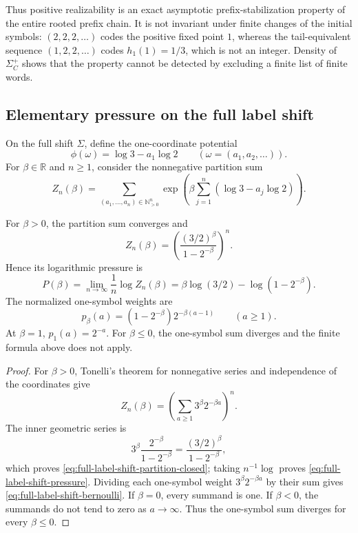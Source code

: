 Thus positive realizability is an exact asymptotic prefix-stabilization
property of the entire rooted prefix chain.  It is not invariant under finite
changes of the initial symbols: $(2,2,2,\ldots)$ codes the positive fixed point
$1$, whereas the tail-equivalent sequence $(1,2,2,\ldots)$ codes
$h_1(1)=1/3$, which is not an integer.  Density of $\Sigma_C^+$ shows that the
property cannot be detected by excluding a finite list of finite words.

\subsection{Elementary pressure on the full label shift}

On the full shift $\Sigma$, define the one-coordinate potential
\[
 \phi(\omega)=\log3-a_1\log2
 \qquad(\omega=(a_1,a_2,\ldots)).
\]
For $\beta\in\mathbb R$ and $n\geq1$, consider the nonnegative partition sum
\begin{equation}
\label{eq:full-label-shift-partition}
 Z_n(\beta)
 =\sum_{(a_1,\ldots,a_n)\in\mathbb N_{>0}^n}
   \exp\left(\beta\sum_{j=1}^n(\log3-a_j\log2)\right).
\end{equation}

\begin{proposition}
\label{prop:full-label-shift-pressure}
For $\beta>0$, the partition sum converges and
\begin{equation}
\label{eq:full-label-shift-partition-closed}
 Z_n(\beta)
 =\left(\frac{(3/2)^\beta}{1-2^{-\beta}}\right)^n.
\end{equation}
Hence its logarithmic pressure is
\begin{equation}
\label{eq:full-label-shift-pressure}
 P(\beta)
 =\lim_{n\to\infty}\frac1n\log Z_n(\beta)
 =\beta\log(3/2)-\log(1-2^{-\beta}).
\end{equation}
The normalized one-symbol weights are
\begin{equation}
\label{eq:full-label-shift-bernoulli}
 p_\beta(a)
 =(1-2^{-\beta})2^{-\beta(a-1)}
 \qquad(a\geq1).
\end{equation}
At $\beta=1$, $p_1(a)=2^{-a}$.  For $\beta\leq0$, the one-symbol sum
diverges and the finite formula above does not apply.
\end{proposition}

\begin{proof}
For $\beta>0$, Tonelli's theorem for nonnegative series and independence of
the coordinates give
\[
 Z_n(\beta)
 =\left(\sum_{a\geq1}3^\beta2^{-\beta a}\right)^n.
\]
The inner geometric series is
\[
 3^\beta\frac{2^{-\beta}}{1-2^{-\beta}}
 =\frac{(3/2)^\beta}{1-2^{-\beta}},
\]
which proves \eqref{eq:full-label-shift-partition-closed}; taking
$n^{-1}\log$ proves \eqref{eq:full-label-shift-pressure}.  Dividing each
one-symbol weight $3^\beta2^{-\beta a}$ by their sum gives
\eqref{eq:full-label-shift-bernoulli}.  If $\beta=0$, every summand is one.
If $\beta<0$, the summands do not tend to zero as $a\to\infty$.  Thus the
one-symbol sum diverges for every $\beta\leq0$.
\end{proof}

